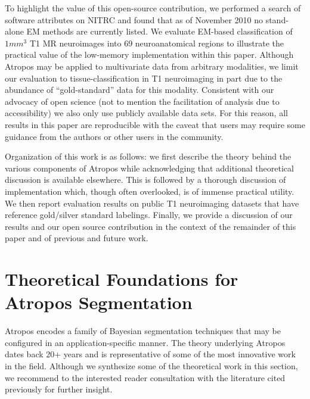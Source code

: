 \documentclass[11pt,english]{article}
\begin{document}
To highlight the
value of this open-source contribution, we performed a search of
software attributes on NITRC and found that as of November 2010 no
stand-alone EM methods are currently listed.
We evaluate EM-based classification of $1 mm^3$ T1 MR
neuroimages into 69 neuroanatomical regions to illustrate the practical
value of the low-memory implementation within this paper.  
Although Atropos may be applied to
multivariate data from arbitrary modalities, we limit our evaluation
to tissue-classification in T1 neuroimaging in part due to the
abundance of ``gold-standard'' data for this modality.  Consistent
with our advocacy of open science (not to mention the facilitation of
analysis due to accessibility) we also only use publicly available
data sets.  For this reason, all results in this paper are
reproducible with the caveat that users may require some guidance from
the authors or other users in the community.

Organization of this work is as follows: we first describe the theory
behind the various components of Atropos while
acknowledging that additional theoretical discussion is available elsewhere.  
This is followed by a thorough
discussion of implementation which, though often overlooked, is of
immense practical utility.  We then report evaluation results on
public T1 neuroimaging datasets that have reference gold/silver
standard labelings.  Finally, we provide a discussion of our results
and our open source contribution in the context of the remainder of
this paper and of previous and future work.

\section{Theoretical Foundations for Atropos Segmentation} 

Atropos encodes a family of Bayesian segmentation techniques that may be configured in an application-specific manner.  The theory underlying Atropos dates back 20$+$ years and is representative of some of the most innovative work in the field.  Although we synthesize some of the theoretical work in this section, we recommend to the interested reader consultation with the literature cited previously for further insight.
\end{document}

